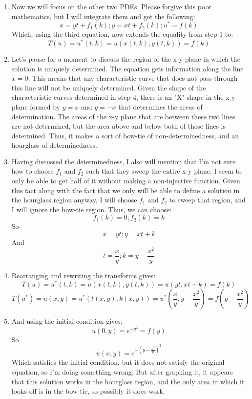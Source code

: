 \documentclass{article}
\begin{document}
\begin{itemize}
\begin{enumerate}
        \item Now we will focus on the other two PDEs. Please forgive this poor mathematics, but I will integrate them and get the following:
        $$x = yt + f_1(k); y = xt + f_2(k); u^* = f(k)$$
        Which, using the third equation, now extends the equality from step 1 to:
        $$T(u) = u^*(t,k) = u(x(t,k),y(t,k)) = f(k)$$
        \item Let's pause for a moment to discuss the region of the x-y plane in which the solution is uniquely determined. The equation gets information along the line $x=0$. This means that any characteristic curve that does not pass through this line will not be uniquely determined. Given the shape of the characteristic curves determined in step 4, there is an "X" shape in the x-y plane formed by $y=x$ and $y=-x$ that determines the areas of determination. The areas of the x-y plane that are between these two lines are not determined, but the area above and below both of these lines is determined. Thus, it makes a sort of bow-tie of non-determinedness, and an hourglass of determinedness. 
        \item Having discussed the determinedness, I also will mention that I'm not sure how to choose $f_1$ and $f_2$ such that they sweep the entire x-y plane. I seem to only be able to get half of it without making a non-injective function. Given this fact along with the fact that we only will be able to define a solution in the hourglass region anyway, I will choose $f_1$ and $f_2$ to sweep that region, and I will ignore the bow-tie region. Thus, we can choose:
        $$ f_1(k) = 0; f_2(k) = k$$
        So
        $$x = yt; y = xt + k$$
        And
        $$t = \frac{x}{y}; k = y - \frac{x^2}{y}$$
        \item Rearranging and rewriting the transforms gives:
        $$T(u) = u^*(t,k) = u(x(t,k),y(t,k)) = u(yt, xt + k) = f(k)$$
        $$T(u^*) = u(x,y) = u^*(t(x,y),k(x,y)) = u^*(\frac{x}{y},y - \frac{x^2}{y}) = f(y - \frac{x^2}{y})$$
        \item And using the initial condition gives:
        $$u(0,y) = e^{-y^2} = f(y)$$
        So
        $$u(x,y) = e^{-\left(y - \frac{x^2}{y}\right)^2}$$
        Which satisfies the initial condition, but it does not satisfy the original equation, so I'm doing something wrong. But after graphing it, it appears that this solution works in the hourglass region, and the only area in which it looks off is in the bow-tie, so possibly it does work.
        
    \end{enumerate}


\end{itemize}
\end{document}

